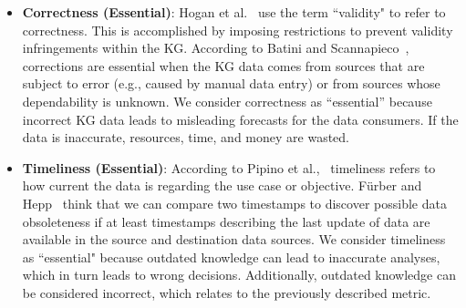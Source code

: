\documentclass[runningheads]{llncs}
\begin{document}
\begin{itemize}
  \item \textbf {Correctness (Essential)}: Hogan et al.~\cite{hogan_knowledge_2022} use the term ``validity" to refer to correctness. 
  This is accomplished by imposing restrictions to prevent validity infringements within the KG. 
  According to Batini and Scannapieco~\cite{Batinidata2006}, corrections are essential when the KG data comes from sources that are subject to error (e.g., caused by manual data entry) or from sources whose dependability is unknown.
  We consider correctness as “essential” because incorrect KG data leads to misleading forecasts for the data consumers. If the data is inaccurate, resources, time, and money are wasted.
  \item \textbf {Timeliness (Essential)}: 
  According to Pipino et al.,~\cite{PipinoData} timeliness refers to how current the data is regarding the use case or objective.
  Fürber and Hepp~\cite{Frber2011SwiqaA} think that we can compare two timestamps to discover possible data obsoleteness if at least timestamps describing the last update of data are available in the source and destination data sources.
  We consider timeliness as ``essential" because outdated knowledge can lead to inaccurate analyses, which in turn leads to wrong decisions. Additionally, outdated knowledge can be considered incorrect, which relates to the previously described metric. 
  

\end{itemize}
\end{document}
